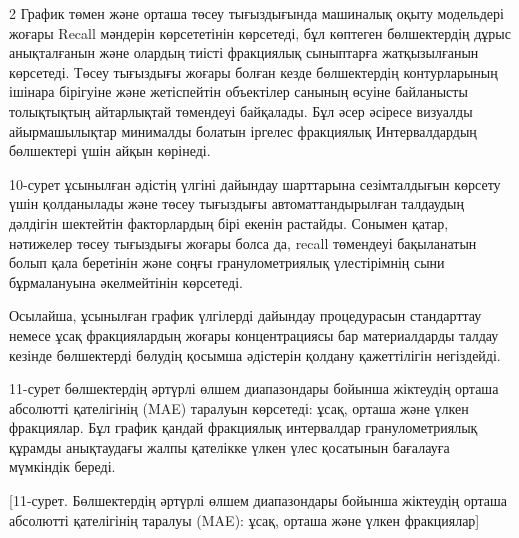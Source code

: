 \begin{multicols}{2}
График төмен және орташа төсеу тығыздығында машиналық оқыту модельдері
жоғары Recall мәндерін көрсететінін көрсетеді, бұл көптеген бөлшектердің
дұрыс анықталғанын және олардың тиісті фракциялық сыныптарға
жатқызылғанын көрсетеді. Төсеу тығыздығы жоғары болған кезде
бөлшектердің контурларының ішінара бірігуіне және жетіспейтін объектілер
санының өсуіне байланысты толықтықтың айтарлықтай төмендеуі байқалады.
Бұл әсер әсіресе визуалды айырмашылықтар минималды болатын іргелес
фракциялық Интервалдардың бөлшектері үшін айқын көрінеді.

10-сурет ұсынылған әдістің үлгіні дайындау шарттарына сезімталдығын
көрсету үшін қолданылады және төсеу тығыздығы автоматтандырылған
талдаудың дәлдігін шектейтін факторлардың бірі екенін растайды. Сонымен
қатар, нәтижелер төсеу тығыздығы жоғары болса да, recall төмендеуі
бақыланатын болып қала беретінін және соңғы гранулометриялық
үлестірімнің сыни бұрмалануына әкелмейтінін көрсетеді.

Осылайша, ұсынылған график үлгілерді дайындау процедурасын стандарттау
немесе ұсақ фракциялардың жоғары концентрациясы бар материалдарды талдау
кезінде бөлшектерді бөлудің қосымша әдістерін қолдану қажеттілігін
негіздейді.

11-сурет бөлшектердің әртүрлі өлшем диапазондары бойынша жіктеудің
орташа абсолютті қателігінің (MAE) таралуын көрсетеді: ұсақ, орташа және
үлкен фракциялар. Бұл график қандай фракциялық интервалдар
гранулометриялық құрамды анықтаудағы жалпы қателікке үлкен үлес
қосатынын бағалауға мүмкіндік береді.
\end{multicols}

[11-сурет. Бөлшектердің әртүрлі өлшем диапазондары бойынша
жіктеудің орташа абсолютті қателігінің таралуы (MAE): ұсақ, орташа және
үлкен фракциялар]

